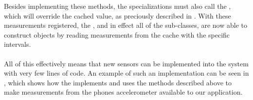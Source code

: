 Besides implementing these methods, the specializations must also call the , which will override the cached value, as preciously described in . With these measurements registered, the , and in effect all of the sub-classes, are now able to construct  objects by reading measurements from the cache with the specific intervals. 
\\\\
All of this effectively means that new sensors can be implemented into the system with very few lines of code. An example of such an implementation can be seen in , which shows how the  implements and uses the methods described above to make measurements from the phones accelerometer available to our application. 



